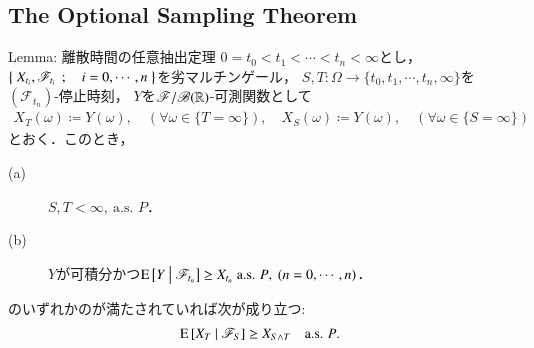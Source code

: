 \subsection{The Optional Sampling Theorem}
	\begin{itembox}[l]{Lemma: 離散時間の任意抽出定理}\label{lem:optional_sampling_theorem}
		$0 = t_0 < t_1 < \cdots < t_n < \infty$とし，
		$\left\{\ X_{t_i},\mathscr{F}_{t_i}\ \, ; \quad i=0,\cdots,n\ \right\}$を劣マルチンゲール，
		$S,T:\Omega \longrightarrow \{t_0,t_1,\cdots,t_n,\infty\}$を$(\mathscr{F}_{t_n})$-停止時刻，
		$Y$を$\mathscr{F}/\mathscr{B}(\mathbb{R})$-可測関数として
		\begin{align}
			X_T(\omega) \coloneqq Y(\omega), \quad (\forall \omega \in \{T=\infty\}), \quad
			X_S(\omega) \coloneqq Y(\omega), \quad (\forall \omega \in \{S=\infty\})
		\end{align}
		とおく．このとき，
		\begin{description}
			\item[(a)] $S,T < \infty,\ \mbox{a.s. $P$}$．
			\item[(b)] $Y$が可積分かつ$\cexp{Y}{\mathscr{F}_{t_n}} \geq X_{t_n}\ \mbox{a.s. $P$},\ (n=0,\cdots,n)$．
		\end{description}
		のいずれかのが満たされていれば次が成り立つ:
		\begin{align}
			\operatorname{E} \left[ X_T \ \middle|\ \mathscr{F}_S \right] \geq X_{S \wedge T}
			\quad \mbox{a.s. $P$}.
			\label{eq:lem_optional_sampling_theorem_1}
		\end{align}
	\end{itembox}
	
